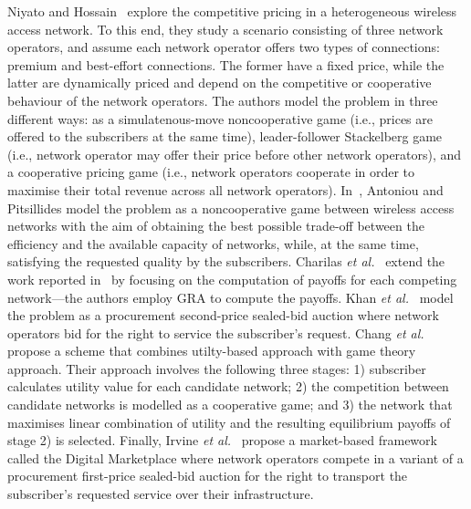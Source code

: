 Niyato and Hossain~\cite{NiyatoHossain2008} explore the competitive pricing in a heterogeneous wireless access network. To this end, they study a scenario consisting of three network operators, and assume each network operator offers two types of connections: premium and best-effort connections. The former have a fixed price, while the latter are dynamically priced and depend on the competitive or cooperative behaviour of the network operators. The authors model the problem in three different ways: as a simulatenous-move noncooperative game (i.e., prices are offered to the subscribers at the same time), leader-follower Stackelberg game (i.e., network operator may offer their price before other network operators), and a cooperative pricing game (i.e., network operators cooperate in order to maximise their total revenue across all network operators). In~\cite{Antoniou07}, Antoniou and Pitsillides model the problem as a noncooperative game between wireless access networks with the aim of obtaining the best possible trade-off between the efficiency and the available capacity of networks, while, at the same time, satisfying the requested quality by the subscribers. Charilas \emph{et al.}~\cite{Charilas08,Charilas2009} extend the work reported in~\cite{Antoniou07} by focusing on the computation of payoffs for each competing network---the authors employ GRA to compute the payoffs. Khan \emph{et al.}~\cite{Khan110,Khan210,Khan310} model the problem as a procurement second-price sealed-bid auction where network operators bid for the right to service the subscriber's request. Chang \emph{et al.}~\cite{Chang09} propose a scheme that combines utilty-based approach with game theory approach. Their approach involves the following three stages: 1) subscriber calculates utility value for each candidate network; 2) the competition between candidate networks is modelled as a cooperative game; and 3) the network that maximises linear combination of utility and the resulting equilibrium payoffs of stage 2) is selected. Finally, Irvine \emph{et al.}~\cite{DMLeBodic00, DMIrvine01, DMIrvine02} propose a market-based framework called the Digital Marketplace where network operators compete in a variant of a procurement first-price sealed-bid auction for the right to transport the subscriber's requested service over their infrastructure.

